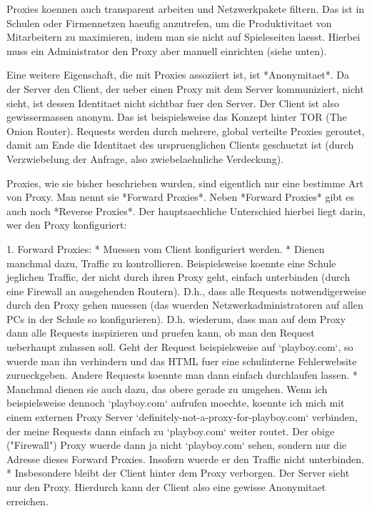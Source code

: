 Proxies koennen auch transparent arbeiten und Netzwerkpakete filtern. Das ist in
Schulen oder Firmennetzen haeufig anzutrefen, um die Produktivitaet von
Mitarbeitern zu maximieren, indem man sie nicht auf Spieleseiten laesst. Hierbei
muss ein Administrator den Proxy aber manuell einrichten (siehe unten).

Eine weitere Eigenschaft, die mit Proxies assoziiert ist, ist *Anonymitaet*. Da
der Server den Client, der ueber einen Proxy mit dem Server kommuniziert, nicht
sieht, ist dessen Identitaet nicht sichtbar fuer den Server. Der Client ist also
gewissermassen anonym. Das ist beispielsweise das Konzept hinter TOR (The Onion
Router). Requests werden durch mehrere, global verteilte Proxies geroutet, damit
am Ende die Identitaet des urspruenglichen Clients geschuetzt ist (durch
Verzwiebelung der Anfrage, also zwiebelaehnliche Verdeckung).

Proxies, wie sie bisher beschrieben wurden, sind eigentlich nur eine bestimme
Art von Proxy. Man nennt sie *Forward Proxies*. Neben *Forward Proxies* gibt es
auch noch *Reverse Proxies*. Der hauptsaechliche Unterschied hierbei liegt
darin, wer den Proxy konfiguriert:

1. Forward Proxies:
   * Muessen vom Client konfiguriert werden.
   * Dienen manchmal dazu, Traffic zu kontrollieren. Beispielsweise koennte eine
     Schule jeglichen Traffic, der nicht durch ihren Proxy geht, einfach
     unterbinden (durch eine Firewall an ausgehenden Routern). D.h., dass alle
     Requests notwendigerweise durch den Proxy gehen muessen (das wuerden
     Netzwerkadministratoren auf allen PCs in der Schule so
     konfigurieren). D.h. wiederum, dass man auf dem Proxy dann alle Requests
     inspizieren und pruefen kann, ob man den Request ueberhaupt zulassen
     soll. Geht der Request beispielsweise auf `playboy.com`, so wuerde man ihn
     verhindern und das HTML fuer eine schulinterne Fehlerwebsite
     zurueckgeben. Andere Requests koennte man dann einfach durchlaufen lassen.
   * Manchmal dienen sie auch dazu, das obere gerade zu umgehen. Wenn ich
     beispielsweise dennoch `playboy.com` aufrufen moechte, koennte ich mich mit
     einem externen Proxy Server `definitely-not-a-proxy-for-playboy.com`
     verbinden, der meine Requests dann einfach zu `playboy.com` weiter
     routet. Der obige ("Firewall") Proxy wuerde dann ja nicht `playboy.com`
     sehen, sondern nur die Adresse dieses Forward Proxies. Insofern wuerde er
     den Traffic nicht unterbinden.
   * Insbesondere bleibt der Client hinter dem Proxy verborgen. Der Server sieht
     nur den Proxy. Hierdurch kann der Client also eine gewisse Anonymitaet
     erreichen.

